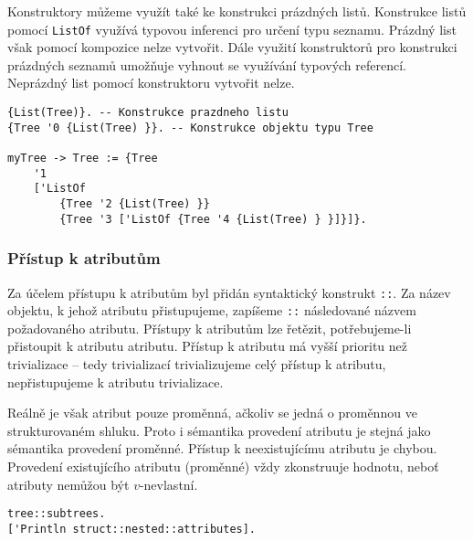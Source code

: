 Konstruktory můžeme využít také ke konstrukci prázdných listů. Konstrukce listů pomocí
\lstinline{ListOf} využívá typovou inferenci pro určení typu seznamu. Prázdný list však pomocí
kompozice nelze vytvořit. Dále využití konstruktorů pro konstrukci prázdných seznamů umožňuje
vyhnout se využívání typových referencí. Neprázdný list pomocí konstruktoru vytvořit nelze.

\begin{lstlisting}[caption={Příklad definice struktury}]
{List(Tree)}. -- Konstrukce prazdneho listu
{Tree '0 {List(Tree) }}. -- Konstrukce objektu typu Tree

myTree -> Tree := {Tree
    '1
    ['ListOf 
        {Tree '2 {List(Tree) }}
        {Tree '3 ['ListOf {Tree '4 {List(Tree) } }]}]}.
\end{lstlisting}

\subsubsection{Přístup k atributům}

Za účelem přístupu k atributům byl přidán syntaktický konstrukt \lstinline{::}. Za název objektu,
k jehož atributu přistupujeme, zapíšeme \lstinline{::} následované názvem požadovaného atributu.
Přístupy k atributům lze řetězit, potřebujeme-li přistoupit k atributu atributu. Přístup k atributu
má vyšší prioritu než trivializace -- tedy trivializací trivializujeme celý přístup k atributu,
nepřistupujeme k atributu trivializace.

Reálně je však atribut pouze proměnná, ačkoliv se jedná o proměnnou ve strukturovaném shluku.
Proto i sémantika provedení atributu je stejná jako sémantika provedení proměnné. Přístup
k neexistujícímu atributu je chybou. Provedení existujícího atributu (proměnné) vždy zkonstruuje
hodnotu, neboť atributy nemůžou být $v$-nevlastní.

\begin{lstlisting}[caption={Příklad přístupu k atributům objektu}]
tree::subtrees.
['Println struct::nested::attributes].
\end{lstlisting}

\endinput
